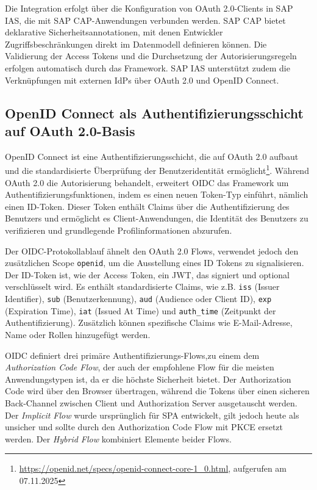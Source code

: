 Die Integration erfolgt über die Konfiguration von OAuth 2.0-Clients in \ac{SAP IAS}, die mit \ac{SAP CAP}-Anwendungen verbunden werden. \ac{SAP CAP} bietet deklarative Sicherheitsannotationen, mit denen Entwickler Zugriffsbeschränkungen direkt im Datenmodell definieren können. Die Validierung der Access Tokens und die Durchsetzung der Autorisierungsregeln erfolgen automatisch durch das Framework. \ac{SAP IAS} unterstützt zudem die Verknüpfungen mit externen \ac{IdP}s über OAuth 2.0 und OpenID Connect.

\subsection{OpenID Connect als Authentifizierungsschicht auf OAuth 2.0-Basis}

OpenID Connect ist eine Authentifizierungsschicht, die auf OAuth 2.0 aufbaut und die standardisierte Überprüfung der Benutzeridentität ermöglicht\footnote{\url{https://openid.net/specs/openid-connect-core-1_0.html}, aufgerufen am 07.11.2025}. Während OAuth 2.0 die Autorisierung behandelt, erweitert \ac{OIDC} das Framework um Authentifizierungsfunktionen, indem es einen neuen Token-Typ einführt, nämlich einen ID-Token. Dieser Token enthält Claims über die Authentifizierung des Benutzers und ermöglicht es Client-Anwendungen, die Identität des Benutzers zu verifizieren und grundlegende Profilinformationen abzurufen.

Der \ac{OIDC}-Protokollablauf ähnelt den OAuth 2.0 Flows, verwendet jedoch den zusätzlichen Scope \texttt{openid}, um die Ausstellung eines ID Tokens zu signalisieren. Der ID-Token ist, wie der Access Token, ein \ac{JWT}, das signiert und optional verschlüsselt wird. Es enthält standardisierte Claims, wie z.B. \texttt{iss} (Issuer Identifier), \texttt{sub} (Benutzerkennung), \texttt{aud} (Audience oder Client ID), \texttt{exp} (Expiration Time), \texttt{iat} (Issued At Time) und \texttt{auth\_time} (Zeitpunkt der Authentifizierung). Zusätzlich können spezifische Claims wie E-Mail-Adresse, Name oder Rollen hinzugefügt werden.

\ac{OIDC} definiert drei primäre Authentifizierungs-Flows,zu einem dem \textit{Authorization Code Flow}, der auch der empfohlene Flow für die meisten Anwendungstypen ist, da er die höchste Sicherheit bietet. Der Authorization Code wird über den Browser übertragen, während die Tokens über einen sicheren Back-Channel zwischen Client und Authorization Server ausgetauscht werden. Der \textit{Implicit Flow} wurde ursprünglich für \ac{SPA} entwickelt, gilt jedoch heute als unsicher und sollte durch den Authorization Code Flow mit \ac{PKCE} ersetzt werden. Der \textit{Hybrid Flow} kombiniert Elemente beider Flows.

